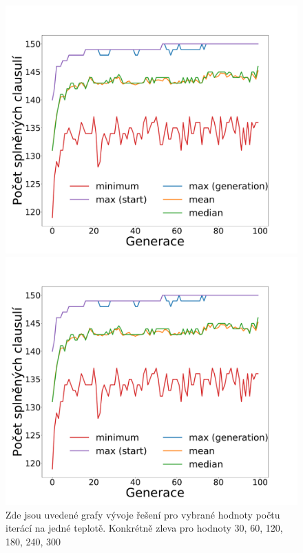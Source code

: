 \documentclass[11pt]{article}
\begin{document}
\begin{figure}
\begin{minipage}[c]{0.32\textwidth}
        \centering \includegraphics[width=\textwidth]{img/1c.pdf} 
    \end{minipage}
    \begin{minipage}[c]{0.32\textwidth}
        \centering \includegraphics[width=\textwidth]{img/1c.pdf} 
    \end{minipage}
   \caption{Zde jsou uvedené grafy vývoje řešení pro vybrané hodnoty počtu iterácí na jedné teplotě. Konkrétně zleva pro hodnoty 30, 60, 120, 180, 240, 300}\label{fig:GVPC}
\end{figure} 
\end{document}
